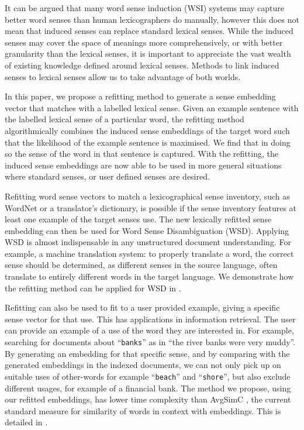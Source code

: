 \documentclass{article}
\def\parencite{\cite}
\newcommand{\wordquote}[1]{\enquote{\texttt{#1}}}
\begin{document}
It can be argued that many word sense induction (WSI) systems may capture better word senses than human lexicographers do manually, however this does not mean that induced senses can replace standard lexical senses.
While the induced senses may cover the space of meanings more comprehensively, or with better granularity than the lexical senses, it is important to appreciate the vast wealth of existing knowledge defined around lexical senses.
Methods to link induced senses to lexical senses allow us to take advantage of both worlds.


In this paper, we propose a refitting method to generate a sense embedding vector that matches with a labelled lexical sense.
Given an example sentence with the labelled lexical sense of a particular word, the refitting method algorithmically combines the induced sense embeddings of the target word such that the likelihood of the example sentence is maximised.
We find that in doing so the sense of the word in that sentence is captured.
With the refitting, the induced sense embeddings are now able to be used in more general situations where standard senses, or user defined senses are desired.


Refitting word sense vectors to match a lexicographical sense inventory, such as WordNet or a translator's dictionary, is possible if the sense inventory features at least one example of the target senses use.
The new lexically refitted sense embedding can then be used for Word Sense Disambiguation (WSD).
Applying WSD is almost indispensable in any unstructured document understanding.
For example, a machine translation system: to properly translate a word, the correct sense should be determined, as different senses in the source language, often translate to entirely different words in the target language.
We demonstrate how the refitting method can be applied for WSD in .

Refitting can also be used to fit to a user provided example, giving a specific sense vector for that use.
This has applications in information retrieval.
The user can provide an example of a use of the word they are interested in.
For example, searching for documents about 
\wordquote{banks} as in \enquote{the river banks were very muddy}.
By generating an embedding for that specific sense, and by comparing with the generated embeddings in the indexed documents, we can not only pick up on suitable uses of other-words for example \wordquote{beach} and \wordquote{shore},
but also exclude different usages, for example of a financial bank.
The method we propose, using our refitted embeddings, has lower time complexity than AvgSimC \parencite{Reisinger2010}, the current standard measure for similarity of words in context with embeddings.
This is detailed in .
\end{document}
